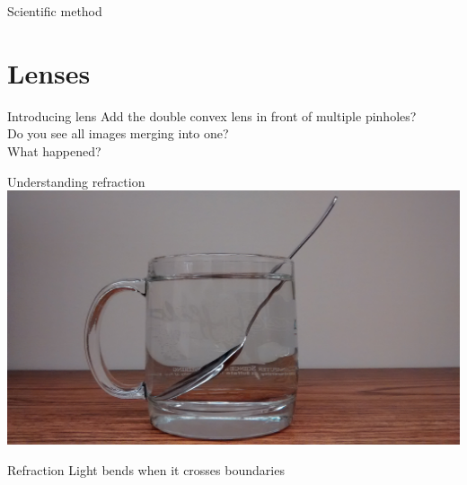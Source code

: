 
\begin{frame}[fragile]{Scientific method}
  
\end{frame}

\section{Lenses}
\begin{frame}{Introducing lens}
  Add the double convex lens in front of multiple pinholes?\\
  \pause
  Do you see all images merging into one?\\
  What happened?
\end{frame}

\begin{frame}{Understanding refraction}
  \centering
  \includegraphics[width=\textwidth]{media/refractionspoon.jpg}
\end{frame}

\begin{frame}{Refraction}
  Light bends when it crosses boundaries\\
  \begin{center}
  \end{center}
\end{frame}


